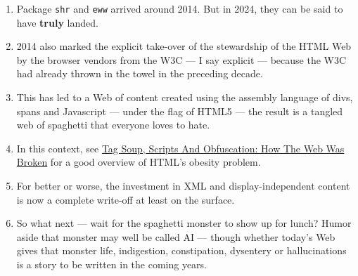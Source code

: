 \documentclass[11pt]{article}
\begin{document}
\begin{enumerate}
\item Package \texttt{shr} and \texttt{eww} arrived around 2014. But in 2024, they
can be said to have \textbf{truly} landed.
\item 2014 also  marked the explicit take-over of the stewardship of the HTML Web by the
browser vendors from the W3C  --- I say
explicit ---  because the W3C had already thrown in the towel in the
preceding decade.
\item This  has led to a Web of content  created using the assembly
language of divs, spans and Javascript --- under the flag of HTML5 ---
the result is a tangled web of spaghetti that everyone loves to hate.
\item In this context, see \href{https://idlewords.com/talks/website\_obesity.htm}{Tag Soup, Scripts And Obfuscation: How The
Web Was Broken} for  a good overview of  HTML's obesity problem.
\item For better or worse, the investment in XML and display-independent
content is now a complete write-off at least on the surface.

\item So what next --- wait for the spaghetti monster to show up for
lunch? Humor aside that monster may well be called AI ---  though
whether  today's Web gives that monster life, indigestion,
constipation,   dysentery or hallucinations  is a story to be
written in the coming years.


\end{enumerate}
\end{document}
